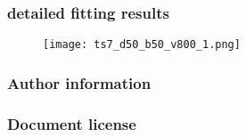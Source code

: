 	\begin{frame}
		\frametitle{\appendixname{} \textendash{} detailed fitting results}
		\begin{figure}
			\texttt{[image: ts7\_d50\_b50\_v800\_1.png]}
		\end{figure}
	\end{frame}

	\begin{frame}[noframenumbering]
		\frametitle{\appendixname{} \textendash{} Author information}\label{app:authinfo}
		\RIPauthorinfo{}
	\end{frame}

	\begin{frame}[noframenumbering]
		\frametitle{\appendixname{} \textendash{} Document license}\label{app:doclicense}
		\expandafter\RIPcopyrightinfo\expandafter{\PresCopyrightType}
	\end{frame}

